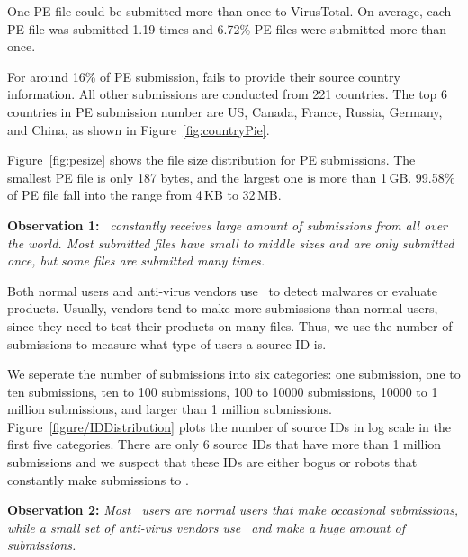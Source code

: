 One PE file could be submitted more than once to VirusTotal. 
On average, each PE file was submitted 1.19 times and 6.72\% PE files were submitted more than once. 

For around 16\% of PE submission, 
\vt fails to provide their source country information. 
All other submissions are conducted from 221 countries. 
The top 6 countries in PE submission number are US, Canada, France, Russia, Germany, and China, 
as shown in Figure~\ref{fig:countryPie}.

Figure~\ref{fig:pesize} shows the file size distribution for PE submissions. 
The smallest PE file is only 187 bytes, and the largest one is more than 1\,GB. 
99.58\% of PE file fall into the range from 4\,KB to 32\,MB. 

{\bf Observation 1:} 
{\em \vt\ constantly receives large amount of submissions from all over the world. 
Most submitted files have small to middle sizes and are only submitted once, 
but some files are submitted many times.}


Both normal users and anti-virus vendors use \vt\ to detect malwares or evaluate products.
Usually, vendors tend to make more submissions than normal users, since they need to test their products on many files.
Thus, we use the number of submissions to measure what type of users a source ID is.

We seperate the number of submissions into six categories:
one submission, one to ten submissions, ten to 100 submissions, 100 to 10000 submissions, 10000 to 1 million submissions, and larger than 1 million submissions.
Figure~\ref{figure/IDDistribution} plots the number of source IDs in log scale in the first five categories.
There are only 6 source IDs that have more than 1 million submissions and we suspect that these IDs are either bogus or robots 
that constantly make submissions to \vt.

{\bf Observation 2:} 
{\em Most \vt\ users are normal users that make occasional submissions, while a small set of anti-virus vendors use \vt\ and make a huge amount of submissions.}

